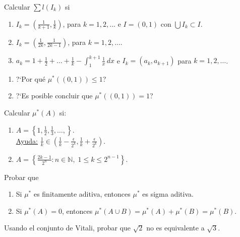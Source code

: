 \documentclass{book}
\newcommand{\nn}{\mathbb{N}}
\begin{document}
\begin{ejer}{} Calcular $\sum l(I_k)$ si
\begin{enumerate}
\item $I_k=\left(\frac{1}{k+1},\frac{1}{k}\right)$, para $k=1,2,\dots$ e $I=(0,1)$  con $\bigcup I_k\subset I$.
\item $I_k=\left(\frac{1}{2k},\frac{1}{2k-1}\right)$, para $k=1,2,\dots$.
\item $a_k=1+\frac{1}{2}+\dots+\frac{1}{k}-\int_1^{k+1} \frac{1}{x}\,dx $ e $I_k=(a_k,a_{k+1})$ para $k=1,2,\dots$.
\end{enumerate}
\end{ejer}  



\begin{ejer}{}\begin{enumerate}
\item ?`Por qu\'e $\mu^*((0,1))\leq 1$?
\item ?`Es posible concluir que  $\mu^*((0,1))= 1$?
\end{enumerate}
\end{ejer}



\begin{ejer}{}  Calcular $\mu^*(A)$ si:
\begin{enumerate}
\item $A=\left\{1,\frac{1}{2},\frac{1}{3},\dots,\right\}$.
\\
\underline{Ayuda:} $\frac{1}{k}\in \left(\frac{1}{k}-\frac{\epsilon}{2^k},\frac{1}{k}+\frac{\epsilon}{2^k}\right)$.
\item $A=\left\{\frac{2k-1}{2^n}:n\in\nn,\;1\leq k\leq 2^{n-1} \right\}$.
\end{enumerate}
\end{ejer}  

\begin{ejer}{} Probar que
\begin{enumerate}
\item Si $\mu^*$ es finitamente aditiva, entonces $\mu^*$ es sigma aditiva.
\item Si $\mu^*(A)=0$, entonces $\mu^*(A\cup B)=\mu^*(A)+\mu^*(B)=\mu^*(B)$.
\end{enumerate}
\end{ejer} 



\begin{ejer}{} Usando el conjunto de Vitali, probar que $\sqrt{2}$ no es equivalente a $\sqrt{3}$.
\end{ejer}
\end{document}
